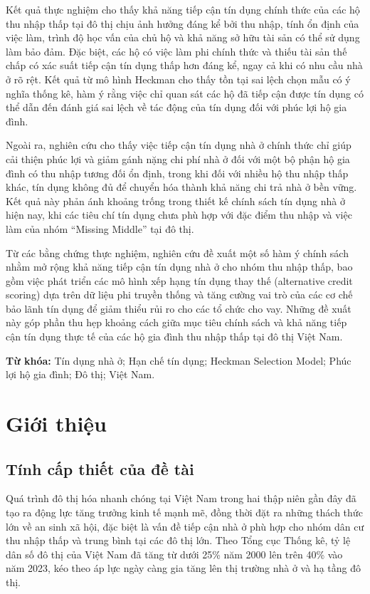 \documentclass[12pt,a4paper]{report}
\begin{document}
	Kết quả thực nghiệm cho thấy khả năng tiếp cận tín dụng chính thức của các hộ thu nhập thấp tại đô thị chịu ảnh hưởng đáng kể bởi thu nhập, tính ổn định của việc làm, trình độ học vấn của chủ hộ và khả năng sở hữu tài sản có thể sử dụng làm bảo đảm. Đặc biệt, các hộ có việc làm phi chính thức và thiếu tài sản thế chấp có xác suất tiếp cận tín dụng thấp hơn đáng kể, ngay cả khi có nhu cầu nhà ở rõ rệt. Kết quả từ mô hình Heckman cho thấy tồn tại sai lệch chọn mẫu có ý nghĩa thống kê, hàm ý rằng việc chỉ quan sát các hộ đã tiếp cận được tín dụng có thể dẫn đến đánh giá sai lệch về tác động của tín dụng đối với phúc lợi hộ gia đình.
	
	Ngoài ra, nghiên cứu cho thấy việc tiếp cận tín dụng nhà ở chính thức chỉ giúp cải thiện phúc lợi và giảm gánh nặng chi phí nhà ở đối với một bộ phận hộ gia đình có thu nhập tương đối ổn định, trong khi đối với nhiều hộ thu nhập thấp khác, tín dụng không đủ để chuyển hóa thành khả năng chi trả nhà ở bền vững. Kết quả này phản ánh khoảng trống trong thiết kế chính sách tín dụng nhà ở hiện nay, khi các tiêu chí tín dụng chưa phù hợp với đặc điểm thu nhập và việc làm của nhóm ``Missing Middle'' tại đô thị.
	
	Từ các bằng chứng thực nghiệm, nghiên cứu đề xuất một số hàm ý chính sách nhằm mở rộng khả năng tiếp cận tín dụng nhà ở cho nhóm thu nhập thấp, bao gồm việc phát triển các mô hình xếp hạng tín dụng thay thế (alternative credit scoring) dựa trên dữ liệu phi truyền thống và tăng cường vai trò của các cơ chế bảo lãnh tín dụng để giảm thiểu rủi ro cho các tổ chức cho vay. Những đề xuất này góp phần thu hẹp khoảng cách giữa mục tiêu chính sách và khả năng tiếp cận tín dụng thực tế của các hộ gia đình thu nhập thấp tại đô thị Việt Nam.
	
	\textbf{Từ khóa:} Tín dụng nhà ở; Hạn chế tín dụng; Heckman Selection Model; Phúc lợi hộ gia đình; Đô thị; Việt Nam.
		
	\chapter{Giới thiệu}
	
	\section{Tính cấp thiết của đề tài}
	
	Quá trình đô thị hóa nhanh chóng tại Việt Nam trong hai thập niên gần đây đã tạo ra động lực tăng trưởng kinh tế mạnh mẽ, đồng thời đặt ra những thách thức lớn về an sinh xã hội, đặc biệt là vấn đề tiếp cận nhà ở phù hợp cho nhóm dân cư thu nhập thấp và trung bình tại các đô thị lớn. Theo Tổng cục Thống kê, tỷ lệ dân số đô thị của Việt Nam đã tăng từ dưới 25\% năm 2000 lên trên 40\% vào năm 2023, kéo theo áp lực ngày càng gia tăng lên thị trường nhà ở và hạ tầng đô thị.
	
\end{document}
